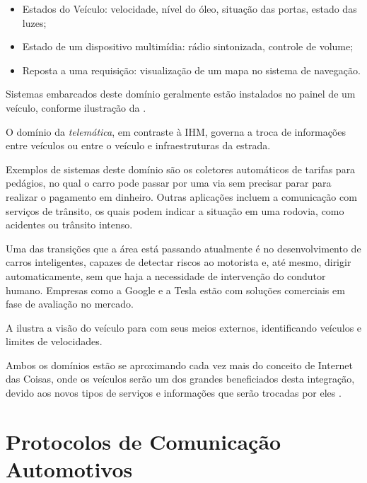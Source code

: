 \begin{itemize}
	\item Estados do Veículo: velocidade, nível do óleo, situação das portas, estado das luzes;
	\item Estado de um dispositivo multimídia: rádio sintonizada, controle de volume;
	\item Reposta a uma requisição: visualização de um mapa no sistema de navegação.
\end{itemize}

Sistemas embarcados deste domínio geralmente estão instalados no painel de um veículo, conforme ilustração da .


O domínio da \emph{telemática}, em contraste à IHM, governa a troca de informações entre veículos ou entre o veículo e infraestruturas da estrada.

Exemplos de sistemas deste domínio são os coletores automáticos de tarifas para pedágios, no qual o carro pode passar por uma via sem precisar parar para realizar o pagamento em dinheiro. Outras aplicações incluem a comunicação com serviços de trânsito, os quais podem indicar a situação em uma rodovia, como acidentes ou trânsito intenso.

Uma das transições que a área está passando atualmente é no desenvolvimento de carros inteligentes, capazes de detectar riscos ao motorista e, até mesmo, dirigir automaticamente, sem que haja a necessidade de intervenção do condutor humano. Empresas como a Google e a Tesla estão com soluções comerciais em fase de avaliação no mercado.

A  ilustra a visão do veículo para com seus meios externos, identificando veículos e limites de velocidades.


Ambos os domínios estão se aproximando cada vez mais do conceito de Internet das Coisas, onde os veículos serão um dos grandes beneficiados desta integração, devido aos novos tipos de serviços e informações que serão trocadas por eles \cite{IoT}.

\section{Protocolos de Comunicação Automotivos}

